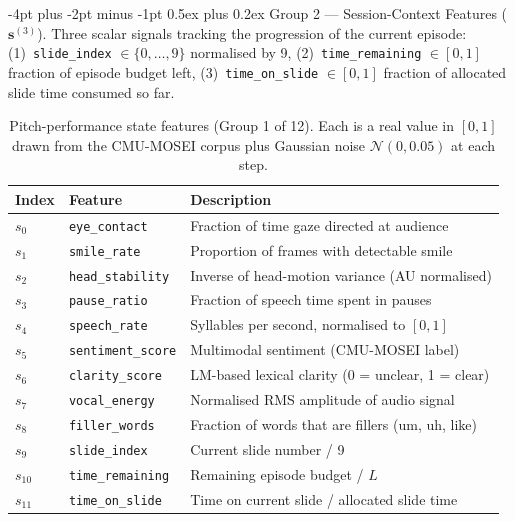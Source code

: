 \documentclass{article}
\makeatletter
\renewcommand\paragraph{\@startsection{paragraph}{4}{\z@}%
  {-4pt plus -2pt minus -1pt}%
  {0.5ex plus 0.2ex}%
  {\normalsize\bf}}
\makeatother
\begin{document}
\paragraph{Group 2 — Session-Context Features ($\mathbf{s}^{(3)}$).}
Three scalar signals tracking the progression of the current episode:
(1)~\texttt{slide\_index} $\in \{0,\ldots,9\}$ normalised by 9,
(2)~\texttt{time\_remaining} $\in [0, 1]$ fraction of episode budget left,
(3)~\texttt{time\_on\_slide} $\in [0, 1]$ fraction of allocated slide
time consumed so far.

\begin{table}[htbp]
\centering
\caption{Pitch-performance state features (Group 1 of 12).
Each is a real value in $[0, 1]$ drawn from the CMU-MOSEI corpus
plus Gaussian noise $\mathcal{N}(0, 0.05)$ at each step.}
\label{tab:state_space}
\small
\begin{tabular}{lll}
\toprule
\textbf{Index} & \textbf{Feature} & \textbf{Description} \\
\midrule
$s_0$ & \texttt{eye\_contact}   & Fraction of time gaze directed at audience \\
$s_1$ & \texttt{smile\_rate}    & Proportion of frames with detectable smile \\
$s_2$ & \texttt{head\_stability}& Inverse of head-motion variance (AU normalised) \\
$s_3$ & \texttt{pause\_ratio}   & Fraction of speech time spent in pauses \\
$s_4$ & \texttt{speech\_rate}   & Syllables per second, normalised to $[0,1]$ \\
$s_5$ & \texttt{sentiment\_score}& Multimodal sentiment (CMU-MOSEI label) \\
$s_6$ & \texttt{clarity\_score} & LM-based lexical clarity (0 = unclear, 1 = clear) \\
$s_7$ & \texttt{vocal\_energy}  & Normalised RMS amplitude of audio signal \\
$s_8$ & \texttt{filler\_words}  & Fraction of words that are fillers (um, uh, like) \\
\midrule
$s_9$ & \texttt{slide\_index}   & Current slide number / 9 \\
$s_{10}$ & \texttt{time\_remaining} & Remaining episode budget / $L$ \\
$s_{11}$ & \texttt{time\_on\_slide} & Time on current slide / allocated slide time \\
\bottomrule
\end{tabular}
\end{table}
\end{document}
